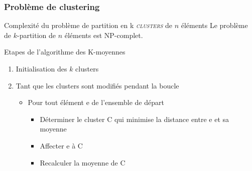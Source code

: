 \documentclass{beamer}
\begin{document}
\begin{frame}
\frametitle{Problème de clustering}

\begin{alertblock}{Complexité du problème de partition en k \textsc{\it clusters} de $n$ éléments}
Le problème de $k$-partition de $n$ éléments est NP-complet.
\end{alertblock}

\pause

\begin{block}{Etapes de l'algorithme des K-moyennes}
\begin{enumerate}
\item Initialisation des $k$ clusters
\item Tant que les clusters sont modifiés pendant la boucle
       \begin{itemize}
       \item Pour tout élément e de l'ensemble de départ
             \begin{itemize}   
             \item Déterminer le cluster C qui minimise la distance entre e et sa moyenne
             \item Affecter e à C
             \item Recalculer la moyenne de C
             \end{itemize}
       \end{itemize}
\end{enumerate}
\end{block}



\end{frame}
\end{document}
